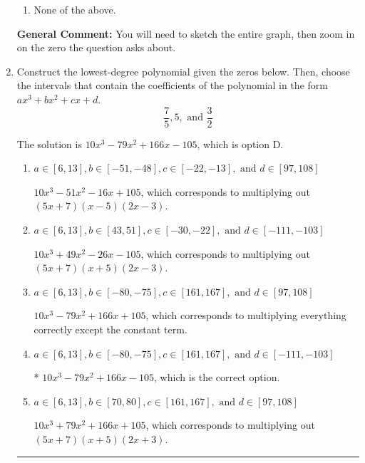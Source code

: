\documentclass{extbook}[14pt]
\newcommand{\litem}[1]{\item #1

\rule{\textwidth}{0.4pt}}
\begin{document}
\begin{enumerate}
{\begin{enumerate}[label=\Alph*.]
\item None of the above.\end{enumerate}
\textbf{General Comment:} You will need to sketch the entire graph, then zoom in on the zero the question asks about.
}
\litem{
Construct the lowest-degree polynomial given the zeros below. Then, choose the intervals that contain the coefficients of the polynomial in the form $ax^3+bx^2+cx+d$.
\[ \frac{7}{5}, 5, \text{ and } \frac{3}{2} \]

The solution is \( 10x^{3} -79 x^{2} +166 x -105 \), which is option D.\begin{enumerate}[label=\Alph*.]
\item \( a \in [6, 13], b \in [-51, -48], c \in [-22, -13], \text{ and } d \in [97, 108] \)

$10x^{3} -51 x^{2} -16 x + 105$, which corresponds to multiplying out $(5x + 7)(x -5)(2x -3)$.
\item \( a \in [6, 13], b \in [43, 51], c \in [-30, -22], \text{ and } d \in [-111, -103] \)

$10x^{3} +49 x^{2} -26 x -105$, which corresponds to multiplying out $(5x + 7)(x + 5)(2x -3)$.
\item \( a \in [6, 13], b \in [-80, -75], c \in [161, 167], \text{ and } d \in [97, 108] \)

$10x^{3} -79 x^{2} +166 x + 105$, which corresponds to multiplying everything correctly except the constant term.
\item \( a \in [6, 13], b \in [-80, -75], c \in [161, 167], \text{ and } d \in [-111, -103] \)

* $10x^{3} -79 x^{2} +166 x -105$, which is the correct option.
\item \( a \in [6, 13], b \in [70, 80], c \in [161, 167], \text{ and } d \in [97, 108] \)

$10x^{3} +79 x^{2} +166 x + 105$, which corresponds to multiplying out $(5x + 7)(x + 5)(2x + 3)$.
\end{enumerate}

}
\end{enumerate}
\end{document}
